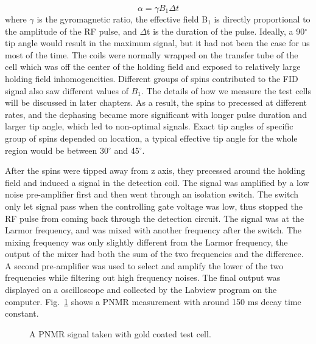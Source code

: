 \begin{equation}\label{tip_angle}
\alpha = \gamma B_{1} \Delta t
\end{equation}
where $\gamma$ is the gyromagnetic ratio, the effective field B$_{1}$ is directly proportional to the amplitude of the RF pulse, and $\Delta$t is the duration of the pulse. Ideally, a 90$^{\circ}$ tip angle would result in the maximum signal, but it had not been the case for us most of the time. The coils were normally wrapped on the transfer tube of the cell which was off the center of the holding field and exposed to relatively large holding field inhomogeneities. Different groups of spins contributed to the FID signal also saw different values of $B_1$. The details of how we measure the test cells will be discussed in later chapters. As a result, the spins to precessed at different rates, and the dephasing became more significant with longer pulse duration and larger tip angle, which led to non-optimal signals. Exact tip angles of specific group of spins depended on location, a typical effective tip angle for the whole region would be between 30$^{\circ}$ and 45$^{\circ}$. 

After the spins were tipped away from z axis, they precessed around the holding field and induced a signal in the detection coil. The signal was amplified by a low noise pre-amplifier first and then went through an isolation switch. The switch only let signal pass when the controlling gate voltage was low, thus stopped the RF pulse from coming back through the detection circuit. The signal was at the Larmor frequency, and was mixed with another frequency after the switch. The mixing frequency was only slightly different from the Larmor frequency, the output of the mixer had both the sum of the two frequencies and the difference. A second pre-amplifier was used to select and amplify the lower of the two frequencies while filtering out high frequency noises. The final output was displayed on a oscilloscope and collected by the Labview program on the computer. Fig.~\ref{FID} shows a PNMR measurement with around 150 ms decay time constant.

\begin{figure}[H]
	\centering
	\caption{{ A PNMR signal taken with gold coated test cell.}}
	\label{FID}
\end{figure}


